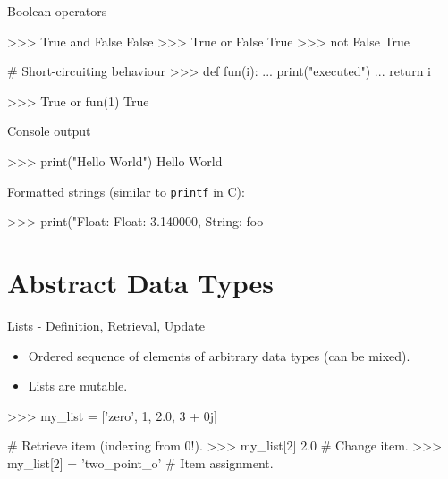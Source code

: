 \documentclass[10pt]{beamer}
\begin{document}
\begin{frame}[fragile]{Boolean operators}

    \begin{pythoncode}
        >>> True and False
        False
        >>> True or False
        True
        >>> not False
        True
    \end{pythoncode}

    \pause

    \begin{pythoncode}
        # Short-circuiting behaviour
        >>> def fun(i):
        ...     print("executed")
        ...     return i

        >>> True or fun(1)
        True
    \end{pythoncode}

\end{frame}


\begin{frame}[fragile]{Console output}

    \begin{pythoncode}
        >>> print("Hello World")
        Hello World
    \end{pythoncode}

    \pause

    Formatted strings (similar to \texttt{printf} in C):

    \begin{pythoncode}
        >>> print("Float: %
        Float: 3.140000, String: foo
    \end{pythoncode}

\end{frame}


\section{Abstract Data Types}

\begin{frame}[fragile]{Lists - Definition, Retrieval, Update}
	\begin{itemize}
		\item \pause Ordered sequence of elements of arbitrary data types (can be mixed).
		\item \pause Lists are mutable.
	\end{itemize}

	\pause
	\begin{pythoncode}
	>>> my_list = ['zero', 1, 2.0, 3 + 0j]
	\end{pythoncode}

	\begin{pythoncode}
		# Retrieve item (indexing from 0!).
		>>> my_list[2]
		2.0
		# Change item.
		>>> my_list[2] = 'two_point_o'  # Item assignment.
	\end{pythoncode}
\end{frame}
\end{document}

